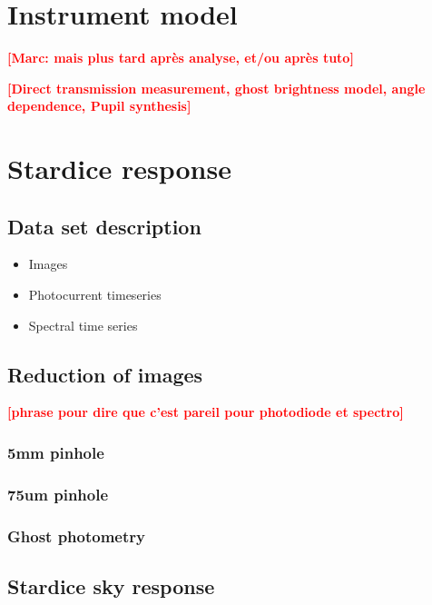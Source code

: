 \documentclass[onecolumn]{aa}
\newcommand{\todo}[1]{\textbf{\textcolor{red}{[#1]}}\xspace}
\begin{document}
\section{Instrument model}\label{sec:model}

\todo{Marc: mais plus tard après analyse, et/ou après tuto}

\todo{Direct transmission measurement, ghost brightness model, angle dependence,  Pupil synthesis}

\section{Stardice response}
\label{sec:dataset}

\subsection{Data set description}
\label{sec:datadesc}

\begin{itemize}
\item Images
\item Photocurrent timeseries
\item Spectral time series
\end{itemize}

\subsection{Reduction of images}
\label{sec:photometry}

\todo{phrase pour dire que c'est pareil pour photodiode et spectro}

\subsubsection{5mm pinhole}

\subsubsection{75um pinhole}

\subsubsection{Ghost photometry}

\subsection{Stardice sky response}
\end{document}
